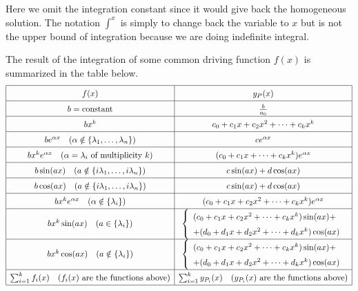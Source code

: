 \documentclass[english,a4paper,12pt]{report}
\begin{document}
Here we omit the integration constant since it would give back the homogeneous solution. The notation \(\int ^x\) is simply to change back the variable to \(x\) but is not the upper bound of integration because we are doing indefinite integral.  


The result of the integration of some common driving function \(f(x)\) is summarized in the table below.  
\[
\renewcommand{\arraystretch}{1.5} %
\begin{array}{|c|c|}
\hline
f(x) & y_P(x) \\ \hline
b = \text{constant} & \frac{b}{a_0} \\ \hline
b x^k & c_0 + c_1 x + c_2 x^2 + \cdots + c_k x^k \\ \hline
b e^{\alpha x} \quad (\alpha \notin \{\lambda_1, \ldots, \lambda_n\}) & c e^{\alpha x} \\ \hline
b x^k e^{\alpha x} \quad (\alpha = \lambda_i \text{ of multiplicity } k) & (c_0 + c_1 x + \cdots + c_k x^k) e^{\alpha x} \\ \hline
b \sin(ax) \quad (a \notin \{i\lambda_1, \ldots, i\lambda_n\}) & c \sin(ax) + d \cos(ax) \\ \hline
b \cos(ax) \quad (a \notin \{i\lambda_1, \ldots, i\lambda_n\}) & c \sin(ax) + d \cos(ax) \\ \hline
b x^k e^{\alpha x} \quad (\alpha \notin \{\lambda_i\}) & (c_0 + c_1 x + c_2 x^2 + \cdots + c_k x^k) e^{\alpha x} \\ \hline
b x^k \sin(ax) \quad (a \in \{\lambda_i\}) & \left\{ \begin{array}{l} (c_0 + c_1 x + c_2 x^2 + \cdots + c_k x^k) \sin(ax)+ \\ +(d_0 + d_1 x + d_2 x^2 + \cdots + d_k x^k) \cos(ax) \end{array} \right. \\ \hline
b x^k \cos(ax) \quad (a \notin \{\lambda_i\}) & \left\{ \begin{array}{l} (c_0 + c_1 x + c_2 x^2 + \cdots + c_k x^k) \sin(ax)+ \\ +(d_0 + d_1 x + d_2 x^2 + \cdots + d_k x^k) \cos(ax) \end{array} \right. \\ \hline
\sum_{i=1}^k f_i(x) \quad (f_i(x) \text{ are the functions above}) & \sum_{i=1}^k y_{P_i}(x) \quad (y_{P_i}(x) \text{ are the functions above}) \\ \hline
\end{array}
\]
\end{document}
